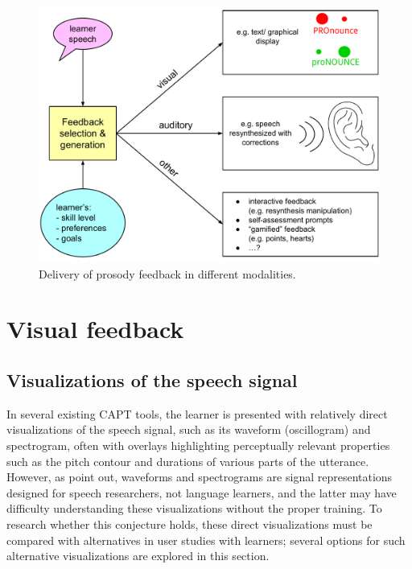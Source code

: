 	\begin{figure}[htb]
		\includegraphics[width=\textwidth]{img/feedback}
		\caption{Delivery of prosody feedback in different modalities.}
		\label{fig:feedback}
	\end{figure}

%


\section{Visual feedback}
\label{sec:fb:visual}


	\subsection{Visualizations of the speech signal}
	\label{sec:visual:visualizations}
	In several existing CAPT tools, %
the learner is presented with relatively direct visualizations of the speech signal, such as its waveform (oscillogram) and spectrogram, often with overlays highlighting perceptually relevant properties such as the pitch contour and durations of various parts of the utterance.
	However, as \textcite{Neri2002} point out, waveforms and spectrograms are signal representations designed for speech researchers, not language learners, and the latter may have difficulty understanding these visualizations without the proper training. To research whether this conjecture holds, these direct visualizations must be compared with alternatives in user studies with learners; several options for such alternative visualizations are explored in this section.
	
